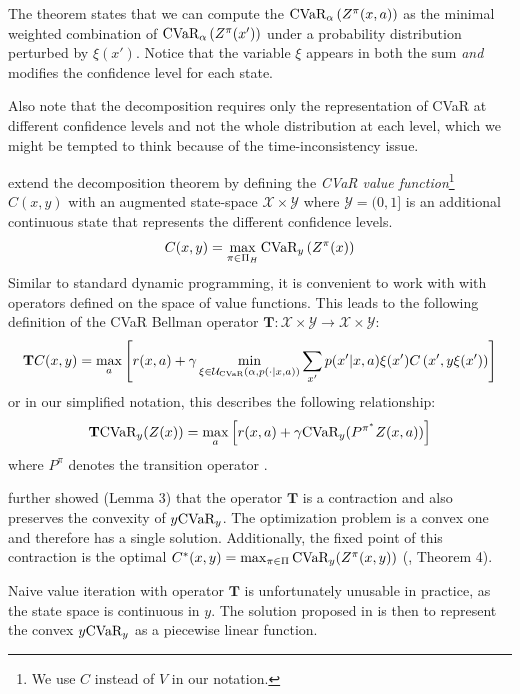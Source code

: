 The theorem states that we can compute the $\text{CVaR}_\alpha\left( {Z^\pi(x, a)} \right)$ as the minimal weighted combination of $\text{CVaR}_\alpha\left( {Z^\pi(x')} \right)$ under a probability distribution perturbed by $\xi(x')$. Notice that the variable $\xi$ appears in both the sum \textit{and} modifies the confidence level for each state.

Also note that the decomposition requires only the representation of CVaR at different confidence levels and not the whole distribution at each level, which we might be tempted to think because of the time-inconsistency issue.

\citet{chow2015risk} extend the decomposition theorem by defining the \emph{CVaR value function}\footnote{We use $C$ instead of $V$ in our notation.} $C(x, y)$ with an augmented state-space $\mathcal{X}\times\mathcal{Y}$ where $\mathcal{Y}=(0,1]$ is an additional continuous state that represents the different confidence levels.
%
\begin{equation}\label{eqn:cdef}
C(x, y)=\max_{\pi \in \Pi_H} \text{CVaR}_{y}\left( {Z^\pi(x)} \right)
\end{equation}
%
Similar to standard dynamic programming, it is convenient to work with with operators defined on the space of value functions. This leads to the following definition of the CVaR Bellman operator $\mathbf{T}:\mathcal{X}\times\mathcal{Y}\to\mathcal{X}\times\mathcal{Y}$:
%
\begin{equation}
\mathbf{T}C(x, y) = \max_a \left[ { r(x, a) + \gamma \min_{\xi \in \mathcal{U}_{\text{CVaR}}(\alpha, p(\cdot | x, a))} \sum_{x'} p(x'| x, a)\xi(x') C\left(x', y\xi(x')\right)} \right]
\end{equation}
%
or in our simplified notation, this describes the following relationship:
%
\begin{equation}\label{eqn:tcvar}
\mathbf{T} \text{CVaR}_y(Z(x))=\max_a \left[ {r(x, a) + \gamma \text{CVaR}_{y}(P^{\pi^*} Z(x, a))} \right]
\end{equation}
where $P^\pi$ denotes the transition operator .

\citet{chow2015risk} further showed (Lemma 3) that the operator $\mathbf{T}$ is a contraction and also preserves the convexity of $y\text{CVaR}_y$. The optimization problem  is a convex one and therefore has a single solution. Additionally, the fixed point of this contraction is the optimal $C^*(x, y) = \max_{\pi \in \Pi} \text{CVaR}_y (Z^\pi(x, y))$ (\citep{chow2015risk}, Theorem 4).
 
Naive value iteration with operator $\mathbf{T}$ is unfortunately unusable in practice, as the state space is continuous in $y$. The solution proposed in \cite{chow2015risk} is then to represent the convex $y\text{CVaR}_y$ as a piecewise linear function. 


